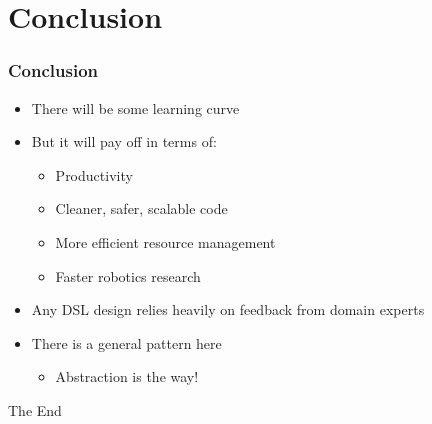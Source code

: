 \documentclass[hyperref={pdfpagelayout=SinglePage}]{beamer}
\begin{document}
\section{Conclusion}
\begin{frame} \frametitle{Conclusion}
	\begin{itemize}	
	\item There will be some learning curve
	\item But it will pay off in terms of:
		\begin{itemize}
		\item Productivity
		\item Cleaner, safer, scalable code
		\item More efficient resource management
		\item Faster robotics research
		\end{itemize}
	\item Any DSL design relies heavily on feedback from domain experts
	\item There is a general pattern here
		\begin{itemize} \item Abstraction is the way! \end{itemize}
	\end{itemize}
\end{frame}

\begin{frame}
	\Huge{\centerline{The End}}
\end{frame}
\end{document}
